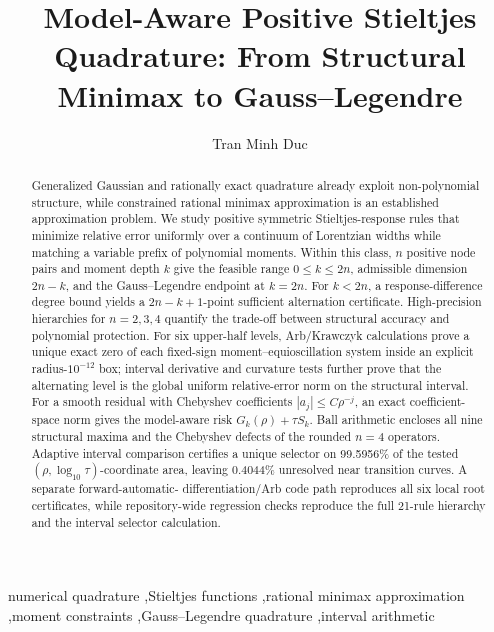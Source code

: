 \documentclass[preprint,12pt]{elsarticle}
\theoremstyle{remark}
\begin{document}
\begin{frontmatter}

\title{Model-Aware Positive Stieltjes Quadrature:
From Structural Minimax to Gauss--Legendre}

\author[inst1]{Tran Minh Duc}


\begin{abstract}
Generalized Gaussian and rationally exact quadrature already exploit
non-polynomial structure, while constrained rational minimax
approximation is an established approximation problem. We study
positive symmetric Stieltjes-response rules that minimize relative
error uniformly over a continuum of Lorentzian widths while matching a
variable prefix of polynomial moments. Within this class, \(n\)
positive node pairs and moment depth \(k\) give the feasible range
\(0\leq k\leq2n\), admissible dimension \(2n-k\), and the
Gauss--Legendre endpoint at \(k=2n\). For \(k<2n\), a
response-difference degree bound yields a \(2n-k+1\)-point sufficient
alternation certificate. High-precision hierarchies for \(n=2,3,4\)
quantify the trade-off between structural accuracy and polynomial
protection. For six upper-half levels, Arb/Krawczyk calculations prove
a unique exact zero of each fixed-sign moment--equioscillation system
inside an explicit radius-\(10^{-12}\) box; interval derivative and
curvature tests further prove that the alternating level is the global
uniform relative-error norm on the structural interval. For a smooth
residual with Chebyshev coefficients \(|a_j|\leq C\rho^{-j}\), an exact
coefficient-space norm gives the model-aware risk
\(G_k(\rho)+\tau S_k\). Ball arithmetic encloses all nine structural
maxima and the Chebyshev defects of the rounded \(n=4\) operators.
Adaptive interval comparison certifies a unique selector on 99.5956\%
of the tested \((\rho,\log_{10}\tau)\)-coordinate area, leaving 0.4044\%
unresolved near transition curves. A separate forward-automatic-
differentiation/Arb code path reproduces all six local root
certificates, while repository-wide regression checks reproduce the
full 21-rule hierarchy and the interval selector calculation.
\end{abstract}

\begin{keyword}
numerical quadrature \sep Stieltjes functions \sep rational minimax
approximation \sep moment constraints \sep Gauss--Legendre quadrature
\sep interval arithmetic
\end{keyword}

\end{frontmatter}
\end{document}

